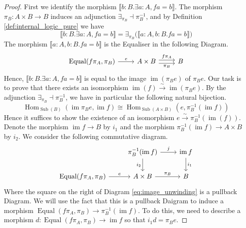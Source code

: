 \documentclass{birkjour}
\theoremstyle{plain}
\theoremstyle{definition}
\newcommand{\lto}{\longrightarrow}
\begin{document}
	\begin{proof}
		First we identify the morphism $\llbracket b:B. \exists a:A, fa = b\rrbracket$. The morphism $\pi_B: A \times B \lto B$ induces an adjunction $\exists_{\pi_B} \dashv\pi_B^{-1}$, and by Definition \ref{def:internal_logic_pure} we have
		\begin{equation}
			\llbracket b:B. \exists a:A, fa = b\rrbracket = \exists_{\pi_B} \big(\llbracket a:A, b:B. fa = b\rrbracket\big)
		\end{equation}
		The morphism $\llbracket a:A, b:B. fa = b\rrbracket$ is the Equaliser in the following Diagram.
		\begin{equation}
			\begin{tikzcd}
				\operatorname{Equal}(f\pi_A,\pi_B)\arrow[r,"{e}"] & A \times B\arrow[r,shift left,"{f\pi_A}"]\arrow[r,shift right,swap,"{\pi_B}"] & B
			\end{tikzcd}
		\end{equation}
		Hence, $\llbracket b:B. \exists a:A, fa = b\rrbracket$ is equal to the image $\operatorname{im}(\pi_Be)$ of $\pi_Be$. Our task is to prove that there exists an isomorphism $\operatorname{im}(f) \stackrel{\sim}{\lto} \operatorname{im}(\pi_Be)$. By the adjunction $\exists_{\pi_B} \dashv \pi_B^{-1}$, we have in particular the following natural bijection.
		\begin{equation}
			\operatorname{Hom}_{\operatorname{Sub}(B)}(\operatorname{im}\pi_B e, \operatorname{im}f) \cong \operatorname{Hom}_{\operatorname{Sub}(A \times B)}(e, \pi_B^{-1}(\operatorname{im}f))
		\end{equation}
		Hence it suffices to show the existence of an isomorphism $e \stackrel{\sim}{\lto} \pi_B^{-1}(\operatorname{im}(f))$. Denote the morphism $\operatorname{im}f \lto B$ by $i_1$ and the morphism $\pi_B^{-1}(\operatorname{im}f) \lto A \times B$ by $i_2$. We consider the following commutative diagram.
		\begin{equation}\label{eq:image_unwinding}
			\begin{tikzcd}
				& \pi_B^{-1}(\operatorname{im}f)\arrow[r,"{j}"]\arrow[d,swap,"{i_2}"] & \operatorname{im}f\arrow[d,"{i_1}"]\\
				\operatorname{Equal}(f\pi_A,\pi_B)\arrow[r,"e"] & A \times B\arrow[r,"{\pi_B}"] & B
			\end{tikzcd}
		\end{equation}
		Where the square on the right of Diagram \eqref{eq:image_unwinding} is a pullback Diagram. We will use the fact that this is a pullback Daigram to induce a morphism $\operatorname{Equal}(f\pi_A,\pi_B) \lto \pi_B^{-1}(\operatorname{im}f)$. To do this, we need to describe a morphism $d: \operatorname{Equal}(f\pi_A,\pi_B) \lto \operatorname{im}f$ so that $i_1 d = \pi_B e$.
		

\end{proof}
\end{document}

